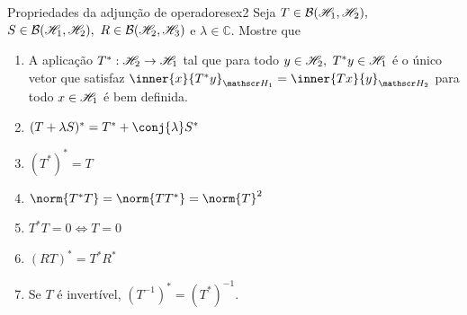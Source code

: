 \begin{exercício}{Propriedades da adjunção de operadores}{ex2}
  Seja \(T \in \mathcal{B}({\mathscr{H}_1},{\mathscr{H}_2}),\) \(S \in \mathcal{B}(\mathscr{H}_1, \mathscr{H}_2),\) \(R \in \mathcal{B}(\mathscr{H}_2, \mathscr{H}_3)\) e \(\lambda \in \mathbb{C}.\) Mostre que
  \begin{enumerate}[label=(\alph*)]
    \item A aplicação \(T^* : \mathscr{H}_2 \to \mathscr{H}_1\) tal que para todo \(y \in \mathscr{H}_2,\) \(T^*y \in \mathscr{H}_1\) é o único vetor que satisfaz \(\inner{x}{T^*y}_{\hilbert_1} = \inner{Tx}{y}_{\hilbert_2}\) para todo \(x \in \mathscr{H}_1\) é bem definida.
    \item \((T + \lambda S)^* = T^* + \conj{\lambda} S^*\)
    \item \((T^*)^* = T\)
    \item \(\norm{T^*T} = \norm{T T^*} = \norm{T}^2\)
    \item \(T^*T = 0 \iff T = 0\)
    \item \((RT)^* = T^* R^*\)
    \item Se \(T\) é invertível, \((T^{-1})^* = (T^*)^{-1}\).
  \end{enumerate}
\end{exercício}

